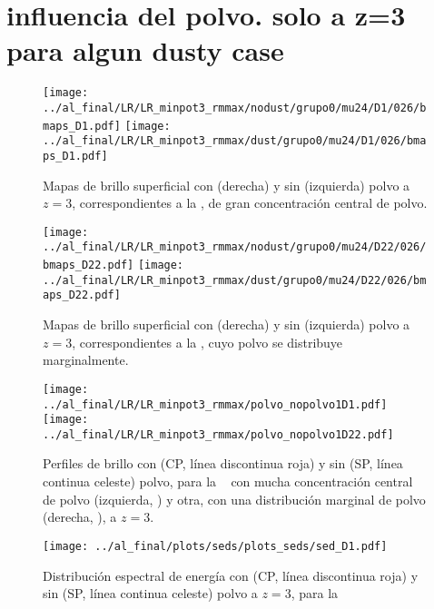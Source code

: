 \section{influencia del polvo. solo a z=3 para algun dusty case}

\begin{figure}[H]
 \centering
 \texttt{[image: ../al\_final/LR/LR\_minpot3\_rmmax/nodust/grupo0/mu24/D1/026/bmaps\_D1.pdf]}
 \texttt{[image: ../al\_final/LR/LR\_minpot3\_rmmax/dust/grupo0/mu24/D1/026/bmaps\_D1.pdf]}
\caption{Mapas de brillo superficial con (derecha) y sin (izquierda) polvo a $z=3$, correspondientes a la , de gran concentraci\'on central de polvo.}
\label{fig:polvo1}
\end{figure}


\begin{figure}[H]
 \centering
 \texttt{[image: ../al\_final/LR/LR\_minpot3\_rmmax/nodust/grupo0/mu24/D22/026/bmaps\_D22.pdf]}
 \texttt{[image: ../al\_final/LR/LR\_minpot3\_rmmax/dust/grupo0/mu24/D22/026/bmaps\_D22.pdf]}
\caption{Mapas de brillo superficial con (derecha) y sin (izquierda) polvo a $z=3$, correspondientes a la , cuyo polvo se distribuye marginalmente.}
\label{fig:polvo22}
\end{figure}

\begin{figure}[H]
 \texttt{[image: ../al\_final/LR/LR\_minpot3\_rmmax/polvo\_nopolvo1D1.pdf]}
 \texttt{[image: ../al\_final/LR/LR\_minpot3\_rmmax/polvo\_nopolvo1D22.pdf]}
\caption{Perfiles de brillo con (CP, l\'inea discontinua roja) y sin (SP, l\'inea continua celeste) polvo, para la \bcg~ con mucha
concentraci\'on central de polvo (izquierda, ) y otra, con una distribuci\'on marginal de polvo (derecha, ), a $z=3$.}
\label{fig:perfiles}
\end{figure}


\begin{figure}[H]
\centering
 \texttt{[image: ../al\_final/plots/seds/plots\_seds/sed\_D1.pdf]}
\caption{Distribuci\'on espectral de energ\'ia con (CP, l\'inea discontinua roja) y sin (SP, l\'inea continua celeste) polvo a $z=3$, para la }
\label{fig:seds}
\end{figure}


